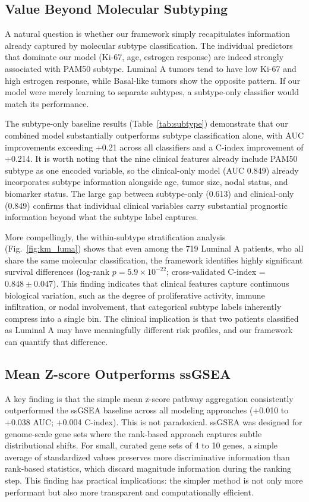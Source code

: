 \documentclass[journal]{IEEEtran}
\begin{document}
\subsection{Value Beyond Molecular Subtyping}

A natural question is whether our framework simply recapitulates information already captured by molecular subtype classification. The individual predictors that dominate our model (Ki-67, age, estrogen response) are indeed strongly associated with PAM50 subtype. Luminal A tumors tend to have low Ki-67 and high estrogen response, while Basal-like tumors show the opposite pattern. If our model were merely learning to separate subtypes, a subtype-only classifier would match its performance.

The subtype-only baseline results (Table~\ref{tab:subtype}) demonstrate that our combined model substantially outperforms subtype classification alone, with AUC improvements exceeding +0.21 across all classifiers and a C-index improvement of +0.214. It is worth noting that the nine clinical features already include PAM50 subtype as one encoded variable, so the clinical-only model (AUC 0.849) already incorporates subtype information alongside age, tumor size, nodal status, and biomarker status. The large gap between subtype-only (0.613) and clinical-only (0.849) confirms that individual clinical variables carry substantial prognostic information beyond what the subtype label captures.

More compellingly, the within-subtype stratification analysis (Fig.~\ref{fig:km_luma}) shows that even among the 719 Luminal A patients, who all share the same molecular classification, the framework identifies highly significant survival differences (log-rank $p = 5.9 \times 10^{-22}$; cross-validated C-index = $0.848 \pm 0.047$). This finding indicates that clinical features capture continuous biological variation, such as the degree of proliferative activity, immune infiltration, or nodal involvement, that categorical subtype labels inherently compress into a single bin. The clinical implication is that two patients classified as Luminal A may have meaningfully different risk profiles, and our framework can quantify that difference.

\subsection{Mean Z-score Outperforms ssGSEA}

A key finding is that the simple mean z-score pathway aggregation consistently outperformed the ssGSEA baseline across all modeling approaches (+0.010 to +0.038 AUC; +0.004 C-index). This is not paradoxical. ssGSEA was designed for genome-scale gene sets where the rank-based approach captures subtle distributional shifts. For small, curated gene sets of 4 to 10 genes, a simple average of standardized values preserves more discriminative information than rank-based statistics, which discard magnitude information during the ranking step. This finding has practical implications: the simpler method is not only more performant but also more transparent and computationally efficient.
\end{document}
